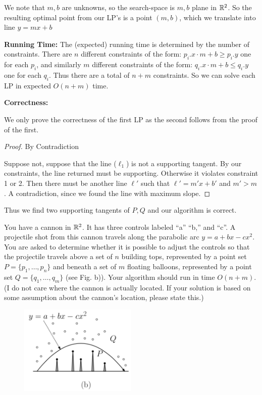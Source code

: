 \documentclass[11pt]{article}
\begin{document}
We note that $m, b$ are unknowns, so the search-space is $m, b$ plane in $\mathbb{R} ^2$.
So the resulting optimal point from our LP's is a point $(m,b)$, which we translate into line $y = mx + b$

\textbf{Running Time:} The (expected) running time is determined by the number of constraints. 
There are $n$ different constraints of the form: $p_i.x \cdot m + b \geq p_i.y$ one for each $p_i$,
and similarly $m$ different constraints of the form: $q_i.x \cdot m + b \leq q_i.y$ one for each $q_i$.
Thus there are a total of $n + m$ constraints. So we can solve each LP in expected $O(n+m)$ time.

\textbf{Correctness:}

We only prove the correctness of the first LP as the second follows from the proof of the first.

\begin{proof} By Contradiction

  Suppose not, suppose that the line ($\ell_1$) is not a supporting tangent. By our constraints,
  the line returned must be supporting. Otherwise it violates constraint 1 or 2.
  Then there must be another line $\ell '$ such that $\ell ' = m' x + b'$ and $m' > m$. A contradiction,
  since we found the line with maximum slope.
\end{proof}

Thus we find two supporting tangents of $P, Q$ and our algorithm is correct.




You have a cannon in $\mathbb{R}^2$. It has three controls labeled ``a'' ``b,''
and ``c''. A projectile shot from this cannon travels along the
parabolic arc $y = a + bx - cx^2$. You are asked to determine whether it
is possible to adjust the controls so that the projectile travels above
a set of $n$ building tops, represented by a point set $P = \{p_1,
\ldots , p_n\}$ and beneath a set of $m$ floating balloons, represented
by a point set $Q = \{q_1, \ldots , q_m\}$ (see Fig. b)). Your algorithm
should run in time $O(n + m)$. (I do not care where the cannon is
actually located. If your solution is based on some assumption about the
cannon's location, please state this.)

\begin{figure}[h]
  \centering
  \includegraphics[width = 0.5\textwidth]{lp_b.png}
\end{figure}
\end{document}
